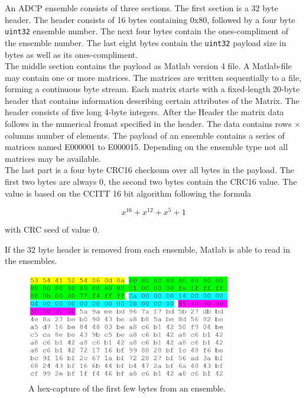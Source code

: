An ADCP ensemble consists of three sections. The first section is a 32 byte header. The header consists of 16 bytes containing 0x80, followed by a four byte \texttt{uint32} ensemble number. The next four bytes contain the ones-compliment of the ensemble number. The last eight bytes contain the \texttt{uint32} payload size in bytes as well as its ones-compliment.\\
The middle section contains the payload as Matlab version 4 file. A Matlab-file may contain one or more matrices. The matrices are written sequentially to a file,  forming a continuous byte stream. Each matrix starts with a fixed-length 20-byte header that contains information describing certain attributes of the Matrix. The header consists of five long 4-byte integers. After the Header the matrix data follows in the numerical fromat specified in the header. The data contains rows $\times$ columns number of elements.
The payload of an ensemble contains a series of matrices named E000001 to E000015. Depending on the ensemble type not all matrices may be available.\\
The last part is a four byte CRC16 checksum over all bytes in the payload. The first two bytes are always 0, the second two bytes contain the CRC16 value. The value is based on the CCITT 16 bit algorithm following the formula 

$$ x^{16} + x^{12} + x^5 +1$$

with CRC seed of value 0.

If the 32 byte header is removed from each ensemble, Matlab is able to read in the ensembles.
\begin{figure}[h]
\centering
      \includegraphics[width=0.8\textwidth]{hexdump}
        \caption{A hex-capture of the first few bytes from an ensemble.}
\end{figure}

